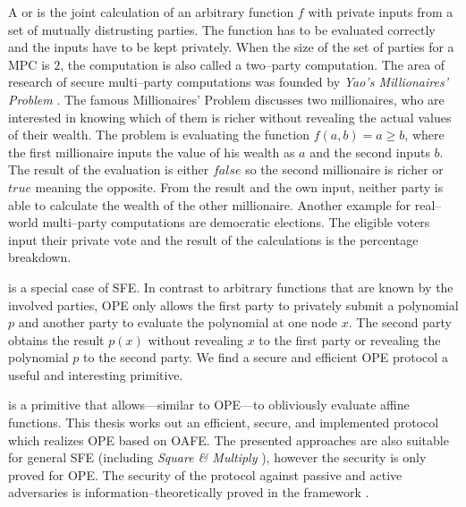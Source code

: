\label{sec:introduction}

A  or  is the joint calculation of an arbitrary function $f$ with
private inputs from a set of mutually distrusting parties. The function has to
be evaluated correctly and the inputs have to be kept privately.  When the size
of the set of parties for a MPC is $2$, the computation is also called a
two--party computation. The area of research of secure multi--party computations
was founded by \emph{Yao's Millionaires' Problem} \cite{yao82}. The famous
Millionaires' Problem discusses two millionaires, who are interested in knowing
which of them is richer without revealing the actual values of their wealth. The
problem is evaluating the function $f(a, b) = a \geq b$, where the first
millionaire inputs the value of his wealth as $a$ and the second inputs $b$. The
result of the evaluation is either $false$ so the second millionaire is richer
or $true$ meaning the opposite. From the result and the own input, neither party
is able to calculate the wealth of the other millionaire. Another example for
real--world multi--party computations are democratic elections. The eligible
voters input their private vote and the result of the calculations is the
percentage breakdown.

 \cite{naor99,naor06} is a special
case of SFE. In contrast to arbitrary functions that are known by the involved
parties, OPE only allows the first party to privately submit a polynomial $p$
and another party to evaluate the polynomial at one node $x$. The second party
obtains the result $p(x)$ without revealing $x$ to the first party or revealing
the polynomial $p$ to the second party. We find a secure and efficient OPE
protocol a useful and interesting primitive.

 \cite{davidgoliath} is a
primitive that allows---similar to OPE---to obliviously evaluate affine
functions. This thesis works out an efficient, secure, and implemented protocol
which realizes OPE based on OAFE. The presented approaches are also suitable for
general SFE (including \emph{Square \& Multiply} \cite{knuth81}), however the
security is only proved for OPE. The security of the protocol against passive
and active adversaries is in\-for\-ma\-tion--the\-o\-ret\-ically proved in the
 framework \cite{canetti05}.


